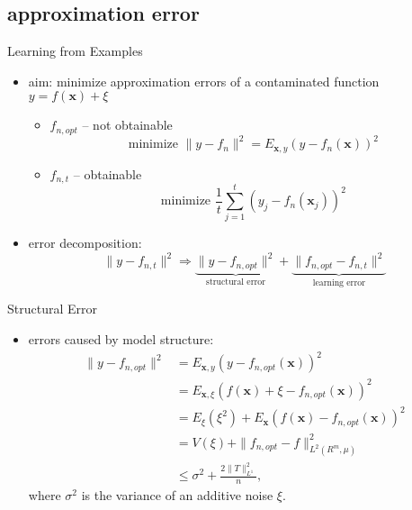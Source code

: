 \documentclass[fleqn,aspectratio=1610]{beamer}
\begin{document}
\subsection{approximation error}
\label{sec:org59edcc3}
\begin{frame}[label={sec:orge1a828d}]{Learning from Examples}
\begin{itemize}
\item \alert{aim:} minimize approximation errors of
a contaminated function \(y=f(\boldsymbol{x})+\xi\) 
\begin{itemize}
\item \(f_{n,opt}\) -- not obtainable
\begin{equation}
  \text{minimize }
  \|y-f_{n}\|^{2}
  =E_{\boldsymbol{x},y}(y-f_{n}(\boldsymbol{x}))^{2}\;
\end{equation}
\item \(f_{n,t}\) -- obtainable
\begin{equation}
  \text{minimize }
  \frac{1}{t}\sum_{j=1}^{t}(y_{j}-f_{n}(\boldsymbol{x}_{j}))^{2}\;
\end{equation}
\end{itemize}
\item \alert{error decomposition:}
\begin{equation}
  \|y-f_{n,t}\|^{2}\Rightarrow
  \underbrace{\|y-f_{n,opt}\|^{2}}_{\text{structural error}}+
  \underbrace{\|f_{n,opt}-f_{n,t}\|^{2}}_{\text{learning error}}
\end{equation}
\end{itemize}
\end{frame}

\begin{frame}[label={sec:org93dff15}]{Structural Error}
\begin{itemize}
\item errors caused by model structure:
\begin{align}
  \|y-f_{n,opt}\|^{2}
  &=E_{\boldsymbol{x},y}(y-f_{n,opt}(\boldsymbol{x}))^{2}\\
  &=E_{\boldsymbol{x},\xi}(f(\boldsymbol{x})+\xi
    -f_{n,opt}(\boldsymbol{x}))^{2}\\
  &=E_{\xi}(\xi^2)+
    E_{\boldsymbol{x}}(f(\boldsymbol{x})
    -f_{n,opt}(\boldsymbol{x}))^{2}\\
  &=V(\xi)+\|f_{n,opt}-f\|^{2}_{L^{2}(R^{m},\mu)}\\
  &\leq\sigma^{2}+\frac{2\|T\|_{L^1}^{2}}{n},
\end{align}
where \(\sigma^{2}\) is the variance of an additive noise \(\xi\).
\end{itemize}
\end{frame}
\end{document}
